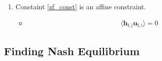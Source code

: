 \documentclass[12pt]{article}
\begin{document}
\begin{enumerate}
\item
	Constaint \eqref{zf_const} is an affine constraint. 
	\begin{itemize}
	\item
		\begin{gather*}
		\langle \mathbf{h_{\mathrm{f,j}}}\mathbf{u_{\mathrm{f,i}}} \rangle =0
		\end{gather*}
	\end{itemize}
\end{enumerate}



\subsection{Finding Nash Equilibrium}
\end{document}

